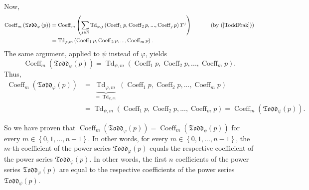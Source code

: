 \documentclass[numbers=enddot,12pt,final,onecolumn,notitlepage]{scrartcl}%
\begin{document}
Now,%
\begin{align*}
\operatorname*{Coeff}\nolimits_{m}\left(  \mathfrak{Todd}_{\varphi}\left(
p\right)  \right)   &  =\operatorname*{Coeff}\nolimits_{m}\left(
\sum\limits_{j\in\mathbb{N}}\operatorname*{Td}\nolimits_{\varphi,j}\left(
\operatorname*{Coeff}\nolimits_{1}p,\operatorname*{Coeff}\nolimits_{2}%
p,...,\operatorname*{Coeff}\nolimits_{j}p\right)  T^{j}\right)
\ \ \ \ \ \ \ \ \ \ \left(  \text{by (\ref{ToddFrak})}\right) \\
&  =\operatorname*{Td}\nolimits_{\varphi,m}\left(  \operatorname*{Coeff}%
\nolimits_{1}p,\operatorname*{Coeff}\nolimits_{2}p,...,\operatorname*{Coeff}%
\nolimits_{m}p\right)  .
\end{align*}
The same argument, applied to $\psi$ instead of $\varphi$, yields%
\[
\operatorname*{Coeff}\nolimits_{m}\left(  \mathfrak{Todd}_{\psi}\left(
p\right)  \right)  =\operatorname*{Td}\nolimits_{\psi,m}\left(
\operatorname*{Coeff}\nolimits_{1}p,\operatorname*{Coeff}\nolimits_{2}%
p,...,\operatorname*{Coeff}\nolimits_{m}p\right)  .
\]
Thus,%
\begin{align*}
\operatorname*{Coeff}\nolimits_{m}\left(  \mathfrak{Todd}_{\varphi}\left(
p\right)  \right)   &  =\underbrace{\operatorname*{Td}\nolimits_{\varphi,m}%
}_{=\operatorname*{Td}\nolimits_{\psi,m}}\left(  \operatorname*{Coeff}%
\nolimits_{1}p,\operatorname*{Coeff}\nolimits_{2}p,...,\operatorname*{Coeff}%
\nolimits_{m}p\right) \\
&  =\operatorname*{Td}\nolimits_{\psi,m}\left(  \operatorname*{Coeff}%
\nolimits_{1}p,\operatorname*{Coeff}\nolimits_{2}p,...,\operatorname*{Coeff}%
\nolimits_{m}p\right)  =\operatorname*{Coeff}\nolimits_{m}\left(
\mathfrak{Todd}_{\psi}\left(  p\right)  \right)  .
\end{align*}


So we have proven that $\operatorname*{Coeff}\nolimits_{m}\left(
\mathfrak{Todd}_{\varphi}\left(  p\right)  \right)  =\operatorname*{Coeff}%
\nolimits_{m}\left(  \mathfrak{Todd}_{\psi}\left(  p\right)  \right)  $ for
every $m\in\left\{  0,1,...,n-1\right\}  $. In other words, for every
$m\in\left\{  0,1,...,n-1\right\}  $, the $m$-th coefficient of the power
series $\mathfrak{Todd}_{\varphi}\left(  p\right)  $ equals the respective
coefficient of the power series $\mathfrak{Todd}_{\psi}\left(  p\right)  $. In
other words, the first $n$ coefficients of the power series $\mathfrak{Todd}%
_{\varphi}\left(  p\right)  $ are equal to the respective coefficients of the
power series $\mathfrak{Todd}_{\psi}\left(  p\right)  $.
\end{document}
